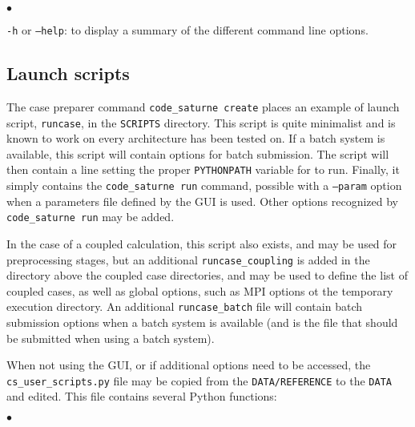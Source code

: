 {{{\begin{list}{$\bullet$}{}
\item \texttt{-h} or \texttt{--help}: to display a summary of the different
command line options.
\end{list}

\subsection{Launch scripts}
\label{prg_runcase}%

The case preparer command \texttt{code\_saturne~create} places an example of launch script,
\texttt{runcase}, in the \texttt{SCRIPTS} directory. This script is quite minimalist and is known to work on every architecture \CS has been tested on.
If a batch system is available, this script will contain options
for batch submission.
The script will then contain a line setting the proper \texttt{PYTHONPATH}
variable for \CS to run.
Finally, it simply contains the \texttt{code\_saturne run}  command,
possible with a \texttt{--param} option when a parameters file
defined by the GUI is used. Other options recognized by
\texttt{code\_saturne run} may be added.

In the case of a coupled calculation, this script also exists, and
may be used for preprocessing stages, but an additional
\texttt{runcase\_coupling} is added in the directory above the coupled case
directories, and may be used to define the list of coupled cases,
as well as global options, such as MPI options ot the temporary
execution directory. An additional \texttt{runcase\_batch} file will
contain batch submission options when a batch system is available
(and is the file that should be submitted when using a batch system).

When not using the GUI, or if additional options need to be accessed,
the \texttt{cs\_user\_scripts.py} file may be copied from
the \texttt{DATA/REFERENCE} to the \texttt{DATA} and edited.
This file contains several Python functions:

\begin{list}{$\bullet$}{}


\end{list}}}}
